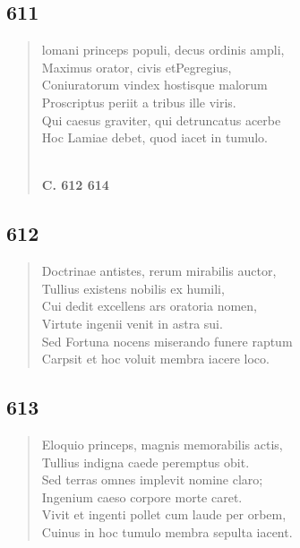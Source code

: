 \documentclass[11pt, a4paper]{report}
\begin{document}
            \subsection*{611}
      \begin{verse}
      lomani princeps populi, decus ordinis ampli, \\ Maximus orator, civis etPegregius, \\ Coniuratorum vindex hostisque malorum \\ Proscriptus periit a tribus ille viris. \\ Qui caesus graviter, qui detruncatus acerbe \\ Hoc Lamiae debet, quod iacet in tumulo. \\ 
        ﻿\pagebreak 
    \begin{center} \textbf{C. 612 614} \end{center} \marginpar{[90]} 
      \end{verse}
  
            \subsection*{612}
      \begin{verse}
      Doctrinae antistes, rerum mirabilis auctor, \\ Tullius existens nobilis ex humili, \\ Cui dedit excellens ars oratoria nomen, \\ Virtute ingenii venit in astra sui. \\ Sed Fortuna nocens miserando funere raptum \\ Carpsit et hoc voluit membra iacere loco. \\ 
      \end{verse}
  
            \subsection*{613}
      \begin{verse}
      Eloquio princeps, magnis memorabilis actis, \\ Tullius indigna caede peremptus obit. \\ Sed terras omnes implevit nomine claro; \\ Ingenium caeso corpore morte caret. \\ Vivit et ingenti pollet cum laude per orbem, \\ Cuinus in hoc tumulo membra sepulta iacent. \\ 
      \end{verse}
  
\end{document}
